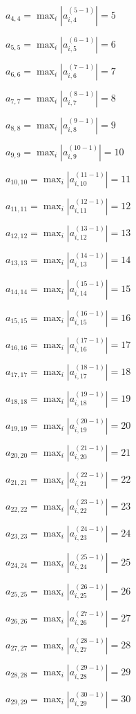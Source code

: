\documentclass[a4paper,12pt]{article}
\begin{document}
$a _{ 4, 4 } =  \max _i |a _{ i, 4 } ^{ (5 - 1) } | = 5$

$a _{ 5, 5 } =  \max _i |a _{ i, 5 } ^{ (6 - 1) } | = 6$

$a _{ 6, 6 } =  \max _i |a _{ i, 6 } ^{ (7 - 1) } | = 7$

$a _{ 7, 7 } =  \max _i |a _{ i, 7 } ^{ (8 - 1) } | = 8$

$a _{ 8, 8 } =  \max _i |a _{ i, 8 } ^{ (9 - 1) } | = 9$

$a _{ 9, 9 } =  \max _i |a _{ i, 9 } ^{ (10 - 1) } | = 10$

$a _{ 10, 10 } =  \max _i |a _{ i, 10 } ^{ (11 - 1) } | = 11$

$a _{ 11, 11 } =  \max _i |a _{ i, 11 } ^{ (12 - 1) } | = 12$

$a _{ 12, 12 } =  \max _i |a _{ i, 12 } ^{ (13 - 1) } | = 13$

$a _{ 13, 13 } =  \max _i |a _{ i, 13 } ^{ (14 - 1) } | = 14$

$a _{ 14, 14 } =  \max _i |a _{ i, 14 } ^{ (15 - 1) } | = 15$

$a _{ 15, 15 } =  \max _i |a _{ i, 15 } ^{ (16 - 1) } | = 16$

$a _{ 16, 16 } =  \max _i |a _{ i, 16 } ^{ (17 - 1) } | = 17$

$a _{ 17, 17 } =  \max _i |a _{ i, 17 } ^{ (18 - 1) } | = 18$

$a _{ 18, 18 } =  \max _i |a _{ i, 18 } ^{ (19 - 1) } | = 19$

$a _{ 19, 19 } =  \max _i |a _{ i, 19 } ^{ (20 - 1) } | = 20$

$a _{ 20, 20 } =  \max _i |a _{ i, 20 } ^{ (21 - 1) } | = 21$

$a _{ 21, 21 } =  \max _i |a _{ i, 21 } ^{ (22 - 1) } | = 22$

$a _{ 22, 22 } =  \max _i |a _{ i, 22 } ^{ (23 - 1) } | = 23$

$a _{ 23, 23 } =  \max _i |a _{ i, 23 } ^{ (24 - 1) } | = 24$

$a _{ 24, 24 } =  \max _i |a _{ i, 24 } ^{ (25 - 1) } | = 25$

$a _{ 25, 25 } =  \max _i |a _{ i, 25 } ^{ (26 - 1) } | = 26$

$a _{ 26, 26 } =  \max _i |a _{ i, 26 } ^{ (27 - 1) } | = 27$

$a _{ 27, 27 } =  \max _i |a _{ i, 27 } ^{ (28 - 1) } | = 28$

$a _{ 28, 28 } =  \max _i |a _{ i, 28 } ^{ (29 - 1) } | = 29$

$a _{ 29, 29 } =  \max _i |a _{ i, 29 } ^{ (30 - 1) } | = 30$
\end{document}
